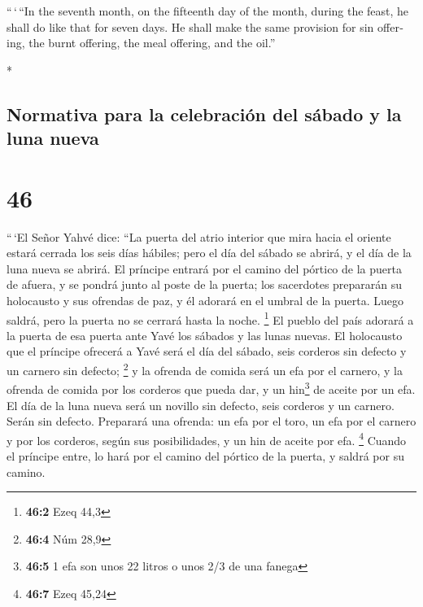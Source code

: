 \begin{paracol}{2}
\begin{otherlanguage}{english}
 ``\,`\,``In the seventh month, on the fifteenth day of
the month, during the feast, he shall do like that for seven days. He
shall make the same provision for sin offering, the burnt offering, the
meal offering, and the oil.''

\end{otherlanguage}

\switchcolumn[0]*

\hypertarget{normativa-para-la-celebraciuxf3n-del-suxe1bado-y-la-luna-nueva}{%
\subsection{Normativa para la celebración del sábado y la luna
nueva}\label{normativa-para-la-celebraciuxf3n-del-suxe1bado-y-la-luna-nueva}}

\hypertarget{section-90}{%
\section{46}\label{section-90}}

 ``\,`El Señor Yahvé dice: ``La puerta del atrio interior
que mira hacia el oriente estará cerrada los seis días hábiles; pero el
día del sábado se abrirá, y el día de la luna nueva se abrirá.
 El príncipe entrará por el camino del pórtico de la
puerta de afuera, y se pondrá junto al poste de la puerta; los
sacerdotes prepararán su holocausto y sus ofrendas de paz, y él adorará
en el umbral de la puerta. Luego saldrá, pero la puerta no se cerrará
hasta la noche. \footnote{\textbf{46:2} Ezeq 44,3}  El
pueblo del país adorará a la puerta de esa puerta ante Yavé los sábados
y las lunas nuevas.  El holocausto que el príncipe
ofrecerá a Yavé será el día del sábado, seis corderos sin defecto y un
carnero sin defecto; \footnote{\textbf{46:4} Núm 28,9}  y
la ofrenda de comida será un efa por el carnero, y la ofrenda de comida
por los corderos que pueda dar, y un hin\footnote{\textbf{46:5} 1 efa
  son unos 22 litros o unos 2/3 de una fanega} de aceite por un efa.
 El día de la luna nueva será un novillo sin defecto, seis
corderos y un carnero. Serán sin defecto.  Preparará una
ofrenda: un efa por el toro, un efa por el carnero y por los corderos,
según sus posibilidades, y un hin de aceite por efa. \footnote{\textbf{46:7}
  Ezeq 45,24}  Cuando el príncipe entre, lo hará por el
camino del pórtico de la puerta, y saldrá por su camino.


\end{paracol}
